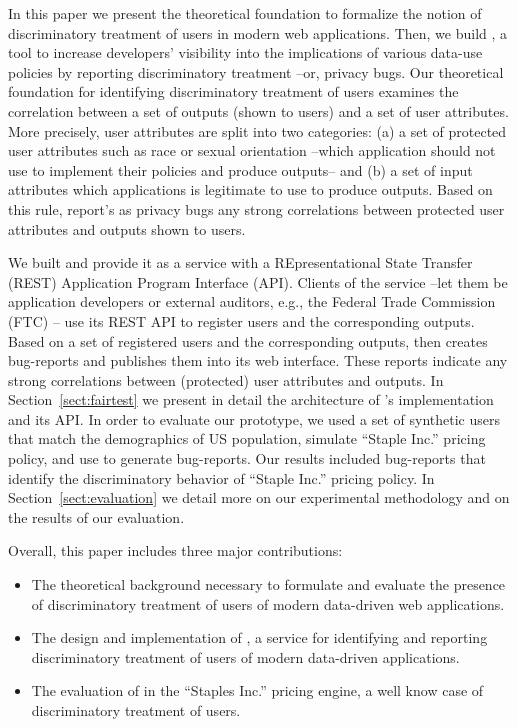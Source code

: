 In this paper we present the theoretical foundation to formalize the notion of
discriminatory treatment of users in modern web applications. Then, we build
\sysname, a tool to increase developers’ visibility into the implications of
various data-use policies by reporting discriminatory treatment --or,
privacy bugs. Our theoretical foundation for identifying discriminatory
treatment of users examines the correlation between a set of outputs (shown to
users) and a set of user attributes. More precisely, user attributes are split
into two categories: (a) a set of protected user attributes such as race or
sexual orientation --which application should not use to implement their
policies and produce outputs-- and (b) a set of input attributes which
applications is legitimate to use to produce outputs. Based on this rule,
\sysname report's as privacy bugs any strong correlations between protected
user attributes and outputs shown to users.

We built \sysname and provide it as a service with a REpresentational
State Transfer (REST) Application Program Interface (API). Clients of the 
\sysname service --let them be application developers or external auditors, e.g.,
the Federal Trade Commission (FTC) -- use its REST API to register users and the
corresponding outputs. Based on a set of registered users and the corresponding
outputs, \sysname then creates bug-reports and publishes them into its web interface.
These reports indicate any strong correlations between (protected) user attributes
and outputs. In Section~\ref{sect:fairtest} we present in detail the architecture
of \sysname's implementation and its API. In order to evaluate our \sysname
prototype, we used a set of synthetic users that match the demographics of
US population, simulate ``Staple Inc.'' pricing policy, and use \sysname to generate
bug-reports. Our results included bug-reports that identify the discriminatory behavior
of ``Staple  Inc.'' pricing policy. In Section~\ref{sect:evaluation} we detail more
on our experimental methodology and on the results of our evaluation.

Overall, this paper includes three major contributions:
\begin{itemize}
  \item The theoretical background necessary to formulate and evaluate the
    presence of discriminatory treatment of users of modern data-driven web
    applications.
  \item The design and implementation of \sysname, a service for identifying and
    reporting discriminatory treatment of users of modern data-driven applications.
  \item The evaluation of \sysname in the ``Staples Inc.'' pricing engine, a well
    know case of discriminatory treatment of users.
\end{itemize}


